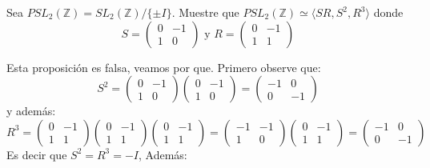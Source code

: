 \newpage
\begin{homeworkProblem}
    Sea $PSL_2(\mathbb{Z})=SL_2(\mathbb{Z})/\{\pm I\}$. Muestre que $PSL_2(\mathbb{Z})\simeq\langle SR,S^2,R^3\rangle$ donde
    $$S=\begin{pmatrix}
          0 & -1\\
          1 & 0
        \end{pmatrix} \text{ y }
        R=\begin{pmatrix}
            0 & -1\\
            1 & 1
        \end{pmatrix}$$
        \begin{solucion}
        Esta proposición es falsa, veamos por que.
        Primero observe que:
        $$S^2=\begin{pmatrix}
          0 & -1\\
          1 & 0
        \end{pmatrix}\begin{pmatrix}
          0 & -1\\
          1 & 0
        \end{pmatrix}=\begin{pmatrix}
          -1 & 0\\
          0 & -1
        \end{pmatrix}$$
        y además:
        $$R^3=\begin{pmatrix}
            0 & -1\\
            1 & 1
        \end{pmatrix}\begin{pmatrix}
            0 & -1\\
            1 & 1
        \end{pmatrix}\begin{pmatrix}
            0 & -1\\
            1 & 1
        \end{pmatrix}=\begin{pmatrix}
            -1 & -1\\
            1 & 0
        \end{pmatrix}\begin{pmatrix}
            0 & -1\\
            1 & 1
        \end{pmatrix}=\begin{pmatrix}
            -1 & 0\\
            0 & -1
        \end{pmatrix}$$
        Es decir que $S^2=R^3=-I$, Además:

\end{solucion}
\end{homeworkProblem}
